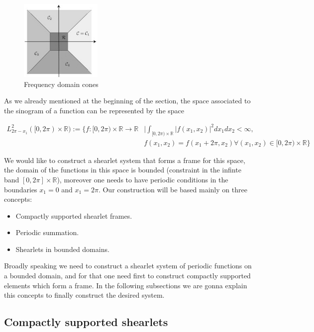 \documentclass[a4paper]{article}
\begin{document}
\bigskip

\begin{figure}[h!]
\centering
\includegraphics[width = 0.35\textwidth]{./cones.jpg}
\caption{Frequency domain cones}
\label{fig:Cones}
\end{figure}

As we already mentioned at the beginning of the section, the space associated to the sinogram of a function can be represented by the space 

$$
\begin{aligned}
L^2_{2\pi-x_1}([0,2\pi)\times\mathbb{R}):= \{ f:[0,2\pi)\times\mathbb{R}\longrightarrow \mathbb{R} &\bigg| \int_{[0,2\pi)\times\mathbb{R}}|f(x_1,x_2)|^2dx_1dx_2<\infty, \\
& f(x_1,x_2)=f(x_1+2\pi,x_2)\forall (x_1,x_2)\in [0,2\pi)\times\mathbb{R} \}
\end{aligned}
$$

We would like to construct a shearlet system that forms a frame for this space, the domain of the functions in this space is bounded (constraint in the infinte band $[0,2\pi]\times \mathbb{R}$), moreover one needs to have periodic conditions in the boundaries $x_1=0$ and $x_1=2\pi$. Our construction will be based mainly on three concepts: 
\begin{itemize}
\item Compactly supported shearlet frames.
\item Periodic summation.
\item Shearlets in bounded domains.
\end{itemize}

Broadly speaking we need to construct a shearlet system of periodic functions on a bounded domain, and for that one need first to construct compactly supported elements which form a frame. In the following subsections we are gonna explain this concepts to finally construct the desired system.

\subsection{Compactly supported shearlets}
\end{document}
